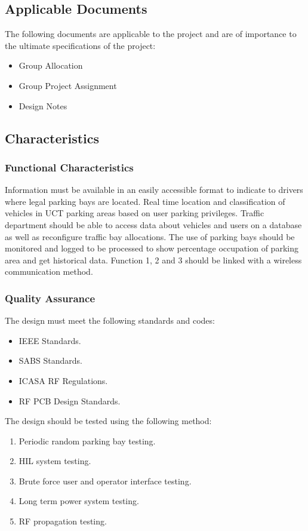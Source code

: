 \subsection{Applicable Documents}
The following documents are applicable to the project and are of importance to the ultimate specifications of the project:
\begin{itemize}
\item Group Allocation
\item Group Project Assignment
\item Design Notes
\end{itemize}

\subsection{Characteristics}
\subsubsection{Functional Characteristics}
Information must be available in an easily accessible format to indicate to drivers where legal parking bays are located.
Real time location and classification of vehicles in UCT parking areas based on user parking privileges. 
Traffic department should be able to access data about vehicles and users on a database as well as reconfigure traffic bay allocations. The use of parking bays should be monitored and logged to be processed to show percentage occupation of parking area and get historical data.
Function 1, 2 and 3 should be linked with a wireless communication method. 
\subsubsection{Quality Assurance}
The design must meet the following standards and codes:
\begin{itemize}
\item IEEE Standards.
\item SABS Standards.
\item ICASA RF Regulations.
\item RF PCB Design Standards.
\end{itemize}

The design should be tested using the following method:
\begin{enumerate}
\item Periodic random parking bay testing.
\item HIL system testing.
\item Brute force user and operator interface testing.
\item Long term power system testing.
\item RF propagation testing.
\end{enumerate}

